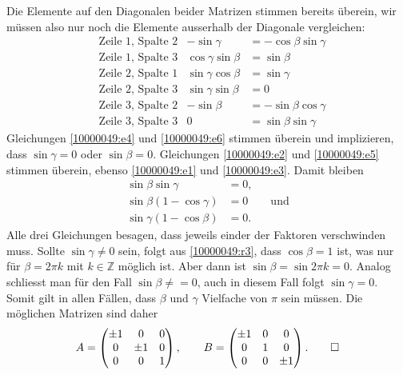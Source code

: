 \begin{loesung}
\begin{teilaufgaben}
Die Elemente auf den Diagonalen beider Matrizen stimmen bereits
überein, wir müssen also nur noch die Elemente ausserhalb der
Diagonale vergleichen:
\begin{align}
&\text{Zeile $1$, Spalte $2$}
&
-\sin\gamma&=-\cos\beta\sin\gamma
\label{10000049:e1}
\\
&\text{Zeile $1$, Spalte $3$}
&
\cos\gamma\sin\beta&=\sin\beta
\label{10000049:e2}
\\
&\text{Zeile $2$, Spalte $1$}
&
\sin\gamma\cos\beta&=\sin\gamma
\label{10000049:e3}
\\
&\text{Zeile $2$, Spalte $3$}
&
\sin\gamma\sin\beta&=0
\label{10000049:e4}
\\
&\text{Zeile $3$, Spalte $2$}
&
-\sin\beta&=-\sin\beta\cos\gamma
\label{10000049:e5}
\\
&\text{Zeile $3$, Spalte $3$}
&
0&=\sin\beta\sin\gamma
\label{10000049:e6}
\end{align}
Gleichungen
\eqref{10000049:e4}
und
\eqref{10000049:e6}
stimmen überein und implizieren, dass $\sin\gamma=0$ oder $\sin\beta=0$.
Gleichungen
\eqref{10000049:e2}
und
\eqref{10000049:e5}
stimmen überein, ebenso
\eqref{10000049:e1}
und
\eqref{10000049:e3}.
Damit bleiben
\begin{align}
\sin\beta   \sin\gamma &=0, \label{10000049:r1}\\
\sin\beta(1-\cos\gamma)&=0\qquad\text{und} \label{10000049:r2}\\
\sin\gamma(1-\cos\beta)&=0.\label{10000049:r3}
\end{align}
Alle drei Gleichungen besagen, dass jeweils einder der Faktoren verschwinden
muss.
Sollte $\sin\gamma\ne0$ sein, folgt aus \eqref{10000049:r3}, dass $\cos\beta=1$
ist, was nur für $\beta=2\pi k$ mit $k\in\mathbb Z$ möglich ist.
Aber dann ist $\sin\beta=\sin 2\pi k=0$.
Analog schliesst man für den Fall $\sin\beta\ne=0$, auch in diesem Fall folgt
$\sin\gamma=0$.
Somit gilt in allen Fällen, dass $\beta$ und $\gamma$ Vielfache von
$\pi$ sein müssen.
Die möglichen Matrizen sind daher
\[
A=\begin{pmatrix}
\pm1&   0&0\\
   0&\pm1&0\\
   0&   0&1
\end{pmatrix},
\qquad
B=\begin{pmatrix}
\pm1&0&   0\\
   0&1&   0\\
   0&0&\pm1
\end{pmatrix}.
\qedhere
\]
\end{teilaufgaben}
\end{loesung}


